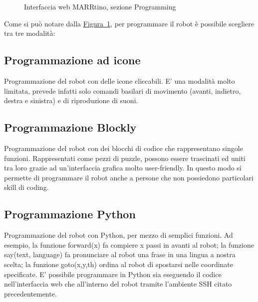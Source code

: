 \documentclass[italian, twoside]{sapthesis} %
\begin{document}
\begin{figure}[H]
    \centering
    \caption{Interfaccia web MARRtino, sezione Programming}
    \label{fig:marrtinoprogramming}
\end{figure}

Come si può notare dalla \hyperref[fig:marrtinoprogramming]{Figura~\ref*{fig:marrtinoprogramming}}, per programmare il robot è possibile scegliere tra tre modalità:

\subsection{Programmazione ad icone}
Programmazione del robot con delle icone cliccabili. E' una modalità molto limitata, prevede infatti solo comandi basilari di movimento (avanti, indietro, destra e sinistra) e di riproduzione di suoni.
\subsection{Programmazione Blockly}
Programmazione del robot con dei blocchi di codice che rappresentano singole funzioni. Rappresentati come pezzi di puzzle, possono essere trascinati ed uniti tra loro grazie ad un'interfaccia grafica molto user-friendly. In questo modo si permette di programmare il robot anche a persone che non possiedono particolari skill di coding.
\subsection{Programmazione Python}
Programmazione del robot con Python, per mezzo di semplici funzioni. Ad esempio, la funzione forward(x) fa compiere x passi in avanti al robot; la funzione say(text, language) fa pronunciare al robot una frase in una lingua a nostra scelta; la funzione goto(x,y,th) ordina al robot di spostarsi nelle coordinate specificate. E' possibile programmare in Python sia eseguendo il codice nell'interfaccia web che all'interno del robot tramite l'ambiente SSH citato precedentemente.
\end{document}
